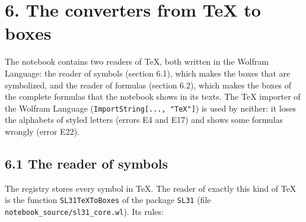 \documentclass[
  10pt,
]{article}
\begin{document}
\hypertarget{the-converters-from-tex-to-boxes}{%
\section{6. The converters from TeX to
boxes}\label{the-converters-from-tex-to-boxes}}

The notebook contains two readers of TeX, both written in the Wolfram
Language: the reader of symbols (section 6.1), which makes the boxes
that are symbolized, and the reader of formulas (section 6.2), which
makes the boxes of the complete formulas that the notebook shows in its
texts. The TeX importer of the Wolfram Language
(\texttt{ImportString{[}...,\ "TeX"{]}}) is used by neither: it loses
the alphabets of styled letters (errors E4 and E17) and shows some
formulas wrongly (error E22).

\hypertarget{the-reader-of-symbols}{%
\subsection{6.1 The reader of symbols}\label{the-reader-of-symbols}}

The registry stores every symbol in TeX. The reader of exactly this kind
of TeX is the function \texttt{SL31TeXToBoxes} of the package
\texttt{SL31\textasciigrave{}} (file
\texttt{notebook\_source/sl31\_core.wl}). Its rules:
\end{document}
